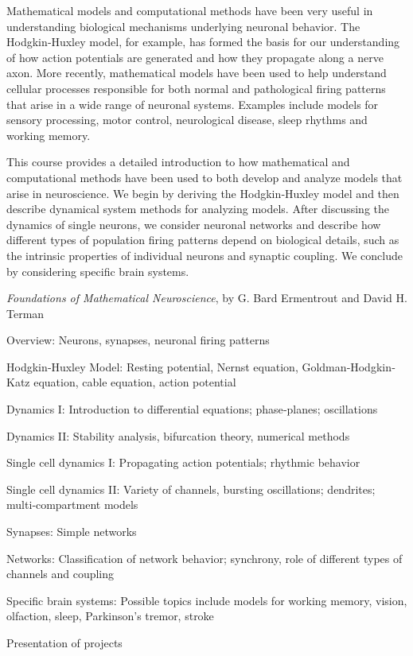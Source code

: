\documentclass{osucourse}
\begin{document}
\CatalogDescription
\PrerequisitesAndExclusions

\begin{Purpose}
Mathematical models and computational methods have been very useful in
understanding biological mechanisms underlying neuronal behavior. The
Hodgkin‐Huxley model, for example, has formed the basis for our
understanding of how action potentials are generated and how they
propagate along a nerve axon. More recently, mathematical models have
been used to help understand cellular processes responsible for both
normal and pathological firing patterns that arise in a wide range of
neuronal systems. Examples include models for sensory processing, motor
control, neurological disease, sleep rhythms and working memory.

This course provides a detailed introduction to how mathematical and
computational methods have been used to both develop and analyze models
that arise in neuroscience. We begin by deriving the Hodgkin‐Huxley
model and then describe dynamical system methods for analyzing models.
After discussing the dynamics of single neurons, we consider neuronal
networks and describe how different types of population firing patterns
depend on biological details, such as the intrinsic properties of
individual neurons and synaptic coupling. We conclude by considering
specific brain systems.
\end{Purpose}

\begin{Text}
\emph{Foundations of Mathematical Neuroscience}, by G. Bard Ermentrout
and David H. Terman
\end{Text}

\begin{TopicsList}
\item
  Overview: Neurons, synapses, neuronal firing patterns
\item
  Hodgkin‐Huxley Model: Resting potential, Nernst equation,
  Goldman‐Hodgkin‐Katz equation, cable equation, action potential
\item
  Dynamics I: Introduction to differential equations; phase‐planes;
  oscillations
\item
  Dynamics II: Stability analysis, bifurcation theory, numerical methods
\item
  Single cell dynamics I: Propagating action potentials; rhythmic
  behavior
\item
  Single cell dynamics II: Variety of channels, bursting oscillations;
  dendrites; multi‐compartment models
\item
  Synapses: Simple networks
\item
  Networks: Classification of network behavior; synchrony, role of
  different types of channels and coupling
\item
  Specific brain systems: Possible topics include models for working
  memory, vision, olfaction, sleep, Parkinson's tremor, stroke
\item
  Presentation of projects
\end{TopicsList}
\end{document}
